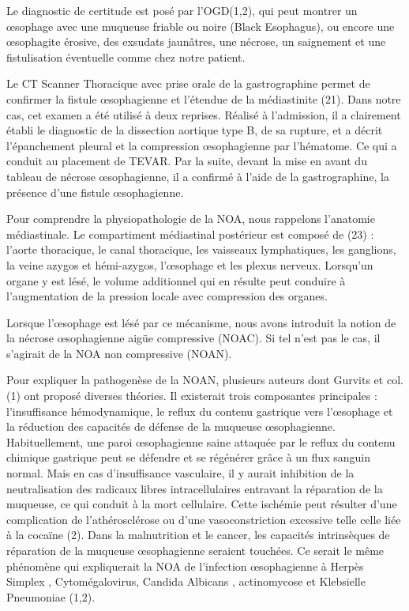 \documentclass[./tfe.tex]{subfiles}
\begin{document}
Le diagnostic de certitude est posé par l'OGD(1,2), qui peut montrer un œsophage avec une muqueuse friable ou noire (Black Esophagus), ou encore une œsophagite érosive, des exsudats jaunâtres, une nécrose, un saignement et une fistulisation éventuelle comme chez notre patient.

Le CT Scanner Thoracique avec prise orale de la gastrographine permet de confirmer la fistule œsophagienne et l’étendue de la médiastinite (21). Dans notre cas, cet examen a été utilisé à deux reprises. Réalisé à l’admission, il a clairement établi le diagnostic de la dissection aortique type B, de sa rupture, et a décrit l’épanchement pleural et la compression œsophagienne par l’hématome. Ce qui a conduit au placement de TEVAR. Par la suite, devant la mise en avant du tableau de nécrose œsophagienne, il a confirmé à l’aide de la gastrographine, la présence d’une fistule œsophagienne.

Pour comprendre la physiopathologie de la NOA, nous rappelons l’anatomie médiastinale. Le compartiment médiastinal postérieur est composé de (23) : l’aorte thoracique, le canal thoracique, les vaisseaux lymphatiques, les ganglions, la veine azygos et hémi-azygos, l’œsophage et les plexus nerveux. Lorsqu’un organe y est lésé, le volume additionnel qui en résulte peut conduire à l’augmentation de la pression locale avec compression des organes.

Lorsque l’œsophage est lésé par ce mécanisme, nous avons introduit la notion de la nécrose œsophagienne aigüe compressive (NOAC). Si tel n’est pas le cas, il s’agirait de la NOA non compressive (NOAN).

Pour expliquer la pathogenèse de la NOAN, plusieurs auteurs dont Gurvits et col.(1) ont proposé diverses théories. Il existerait trois composantes principales : l’insuffisance hémodynamique, le reflux du contenu gastrique vers l’œsophage et la réduction des capacités de défense de la muqueuse œsophagienne. Habituellement, une paroi œsophagienne saine attaquée par le reflux du contenu chimique gastrique peut se défendre et se régénérer grâce à un flux sanguin normal. Mais en cas d’insuffisance vasculaire, il y aurait inhibition de la neutralisation des radicaux libres intracellulaires entravant la réparation de la muqueuse, ce qui conduit à la mort cellulaire. Cette ischémie peut résulter d’une complication de l’athérosclérose ou d’une vasoconstriction excessive telle celle liée à la cocaïne (2). Dans la malnutrition et le cancer, les capacités intrinsèques de réparation de la muqueuse œsophagienne seraient touchées. Ce serait le même phénomène qui expliquerait la NOA de l’infection œsophagienne à Herpès Simplex , Cytomégalovirus, Candida Albicans , actinomycose et Klebsielle Pneumoniae (1,2).
\end{document}

